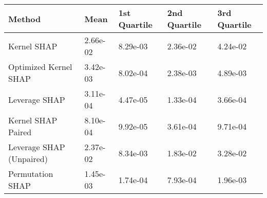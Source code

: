 \begin{tabular}{lllll}
  \toprule
  \textbf{Method} & \textbf{Mean} & \textbf{1st Quartile} & \textbf{2nd Quartile} & \textbf{3rd Quartile} \\ \midrule 
Kernel SHAP & 2.66e-02 & 8.29e-03 & 2.36e-02 & 4.24e-02\\
Optimized Kernel SHAP & 3.42e-03 & 8.02e-04 & 2.38e-03 & 4.89e-03\\
Leverage SHAP & \cellcolor{gold!60}3.11e-04 & \cellcolor{gold!60}4.47e-05 & \cellcolor{gold!60}1.33e-04 & \cellcolor{gold!60}3.66e-04\\
Kernel SHAP Paired & \cellcolor{silver!60}8.10e-04 & \cellcolor{silver!60}9.92e-05 & \cellcolor{silver!60}3.61e-04 & \cellcolor{silver!60}9.71e-04\\
Leverage SHAP (Unpaired) & 2.37e-02 & 8.34e-03 & 1.83e-02 & 3.28e-02\\
Permutation SHAP & \cellcolor{bronze!60}1.45e-03 & \cellcolor{bronze!60}1.74e-04 & \cellcolor{bronze!60}7.93e-04 & \cellcolor{bronze!60}1.96e-03\\
\bottomrule
\end{tabular}